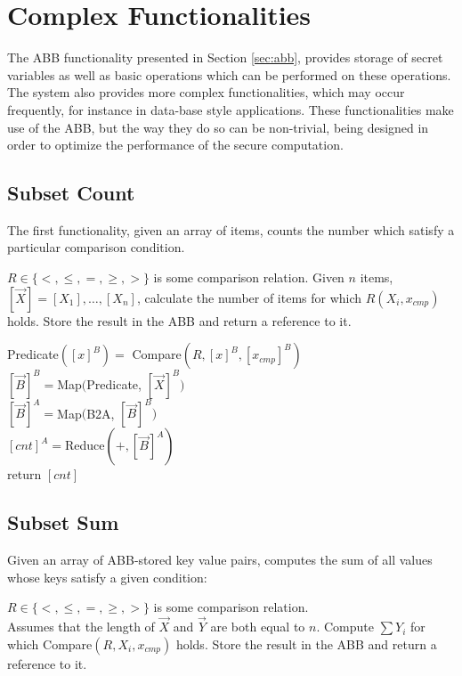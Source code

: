 \section{Complex Functionalities}

The ABB functionality presented in Section \ref{sec:abb},
provides storage of secret variables
as well as basic operations which can be performed on these operations.
The system also provides more complex functionalities, which may occur frequently,
for instance in data-base style applications.
These functionalities make use of the ABB, but the way they do so can be non-trivial,
being designed in order to optimize the performance of the secure computation.

\subsection{Subset Count}

The first functionality, given an array of items, counts the number which satisfy
a particular comparison condition.

\begin{functionality}[SubsetCount$(R, {[\vec{X}]^B}, {[x_{cmp}]^B})$]
	$R \in \{<, \leq, =, \geq, >\}$ is some comparison relation.
	Given $n$ items, $[\vec{X}] = [X_1], \ldots, [X_n]$, calculate the number of items
	for which $R(X_i, x_{cmp})$ holds.
	Store the result in the ABB and return a reference to it.
\end{functionality}

\begin{protocol}[SubsetCount$(R, {[\vec{X}]^B}, {[x_{cmp}]^B})$]
	Predicate$([x]^B) =$ Compare$(R, [x]^B,[x_{cmp}]^{B})$\\
	$[\vec{B}]^{B} = $Map$($Predicate, $[\vec{X}]^B)$\\
	$[\vec{B}]^{A} = $Map$($B2A, $[\vec{B}]^{B})$\\
	$[cnt]^{A} = $Reduce$(+, [\vec{B}]^{A})$\\
	return $[cnt]$
\end{protocol}


\subsection{Subset Sum}

Given an array of ABB-stored key value pairs, 
computes the sum of all values whose keys satisfy a given condition:

\begin{functionality}[SubsetSum$(R, {[\vec{X}]^B}, {[\vec{Y}]}^A, {[x_{cmp}]^B})$]
	$R \in \{<, \leq, =, \geq, >\}$ is some comparison relation.\\
	Assumes that the length of $\vec{X}$ and $\vec{Y}$ are both equal to $n$.
	Compute $\sum Y_i$ for which Compare$(R, X_i, x_{cmp})$ holds.
	Store the result in the ABB and return a reference to it.
\end{functionality}


